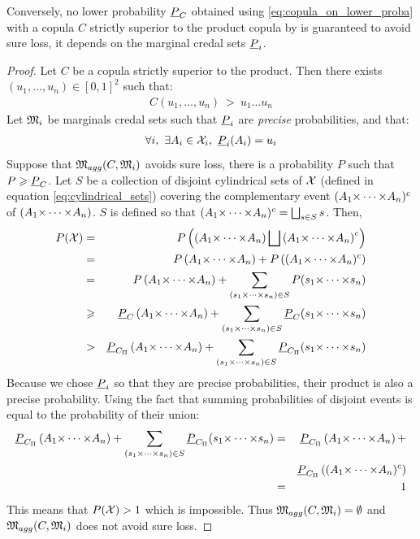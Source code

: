 Conversely, no lower probability ${\underline{P}}_C$ obtained using \eqref{eq:copula_on_lower_proba} with a copula $C$ strictly superior to the product copula by is guaranteed to avoid sure loss, it depends on the marginal credal sets ${\underline{P}}_i$.

\begin{proof}
    Let $C$ be a copula strictly superior to the product. Then there exists $(u_1,\dots,u_n)\in[0,1]^2$ such that:
    \begin{eqnarray*}
        C(u_1,\dots, u_n)~>~u_1\dots u_n
    \end{eqnarray*}
    Let ${\mathfrak{M}}_i$ be marginals credal sets such that ${\underline{P}}_i$ are \textit{precise} probabilities, and that:
    \begin{eqnarray*}
        \forall i,~\exists A_i\in{\mathcal{X}}_i,~{\underline{P}}_i(A_i)=u_i
    \end{eqnarray*}
    Suppose that ${\mathfrak{M}}_{agg}(C, {\mathfrak{M}}_i)$ avoids sure loss, \ie there is a probability $P$ such that $P\geqslant{\underline{P}}_C$. Let $S$ be a collection of disjoint cylindrical sets of ${\mathcal{X}}$ (defined in equation \eqref{eq:cylindrical_sets}) covering the complementary event $(A_1{\times\dots\times} A_n)^c$ of $(A_1{\times\dots\times} A_n)$. $S$ is defined so that $(A_1{\times\dots\times} A_n)^c=\bigsqcup_{s\in S}s$.
    Then,
    \begin{eqnarray*}
        P({\mathcal{X}}) &=& P\left(\left(A_1{\times\dots\times} A_n\right)\bigsqcup\left(A_1{\times\dots\times} A_n\right)^c\right)\\
        &=& P\left(A_1{\times\dots\times} A_n\right)+P\left((A_1{\times\dots\times} A_n)^c\right)\\
        &=& P\left(A_1{\times\dots\times} A_n\right)+\sum_{(s_1{\times\dots\times} s_n)\in S}P(s_1{\times\dots\times} s_n)\\
        &\geqslant& {\underline{P}}_C\left(A_1{\times\dots\times} A_n\right)+\sum_{(s_1{\times\dots\times} s_n)\in S}{\underline{P}}_C(s_1{\times\dots\times} s_n)\\
        &>& {\underline{P}}_{C_\Pi}\left(A_1{\times\dots\times} A_n\right)+\sum_{(s_1{\times\dots\times} s_n)\in S}{\underline{P}}_{C_\Pi}(s_1{\times\dots\times} s_n)
    \end{eqnarray*}
    Because we chose ${\underline{P}}_i$ so that they are precise probabilities, their product is also a precise probability. Using the fact that summing probabilities of disjoint events is equal to the probability of their union:
    \begin{eqnarray*}
        {\underline{P}}_{C_\Pi}\left(A_1{\times\dots\times} A_n\right)+\sum_{(s_1{\times\dots\times} s_n)\in S}{\underline{P}}_{C_\Pi}(s_1{\times\dots\times} s_n) &=& {\underline{P}}_{C_\Pi}\left(A_1{\times\dots\times} A_n\right)+\\
        &&{\underline{P}}_{C_\Pi}\left((A_1{\times\dots\times} A_n)^c\right)\\
        &=& 1
    \end{eqnarray*}
    This means that $P({\mathcal{X}})>1$ which is impossible. Thus ${\mathfrak{M}}_{agg}(C, {\mathfrak{M}}_i)=\emptyset$ and ${\mathfrak{M}}_{agg}(C, {\mathfrak{M}}_i)$ does not avoid sure loss.
\end{proof}


